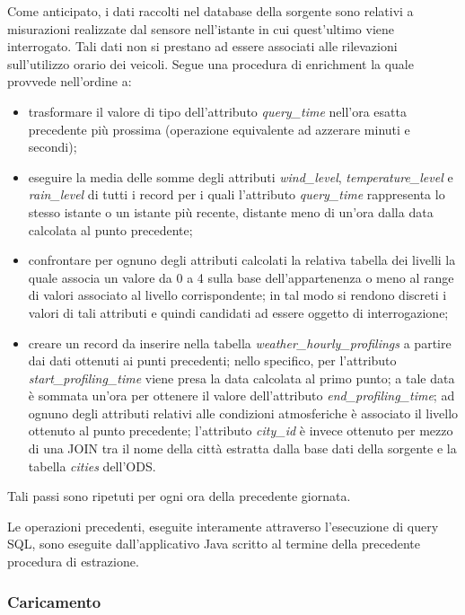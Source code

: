 Come anticipato, i dati raccolti nel database della sorgente sono relativi a
misurazioni realizzate dal sensore nell'istante in cui quest'ultimo viene
interrogato. Tali dati non si prestano ad essere associati alle rilevazioni
sull'utilizzo orario dei veicoli. Segue una procedura di enrichment la quale
provvede nell'ordine a:
\begin{itemize}
\item trasformare il valore di tipo  dell'attributo
\textit{query\_time} nell'ora esatta precedente più prossima (operazione
equivalente ad azzerare minuti e secondi);
\item eseguire la media delle somme degli attributi \textit{wind\_level},
\textit{temperature\_level} e \textit{rain\_level} di tutti i record per i
quali l'attributo \textit{query\_time} rappresenta lo stesso istante o un
istante più recente, distante meno di un'ora dalla data calcolata al punto
precedente;
\item confrontare per ognuno degli attributi calcolati la relativa tabella
dei livelli la quale associa un valore da 0 a 4 sulla base dell'appartenenza
o meno al range di valori associato al livello corrispondente; in tal modo si
rendono discreti i valori di tali attributi e quindi candidati ad essere 
oggetto di interrogazione;
\item creare un record da inserire nella tabella
\textit{weather\_hourly\_profilings} a partire dai dati ottenuti ai punti
precedenti; nello specifico, per l'attributo
\textit{start\_profiling\_time} viene presa la data calcolata al primo punto;
a tale data è sommata un'ora per ottenere il valore dell'attributo
\textit{end\_profiling\_time}; ad ognuno degli attributi relativi alle
condizioni atmosferiche è associato il livello ottenuto al punto precedente;
l'attributo \textit{city\_id} è invece ottenuto per mezzo di una JOIN tra il
nome della città estratta dalla base dati della sorgente e la tabella
\textit{cities} dell'ODS.
\end{itemize}
Tali passi sono ripetuti per ogni ora della precedente giornata.

Le operazioni precedenti, eseguite interamente attraverso l'esecuzione di query 
SQL, sono eseguite dall'applicativo Java scritto al termine della precedente
procedura di estrazione.

\subsubsection{Caricamento}

